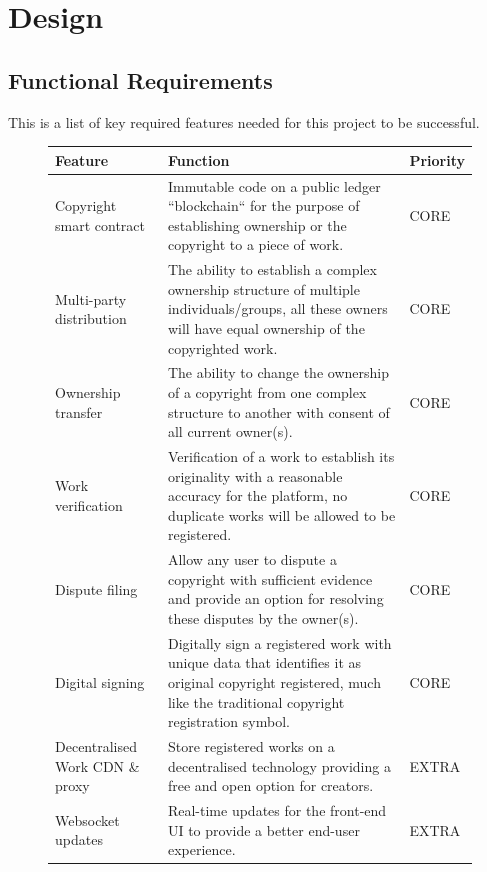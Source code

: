 \section{Design}

\subsection{Functional Requirements}
This is a list of key required features needed for this project to be successful.

\begin{figure}[H]
\caption{Functional requirements}
\begin{table}[H]
\begin{tabular}{|p{}|p{}|p{}|}
\hline
Feature                         & Function                                                                                                                                                        & Priority \\ \hline
Copyright smart contract        & Immutable code on a public ledger “blockchain“ for the purpose of establishing ownership or the copyright to a piece of work.                                   & CORE     \\ \hline
Multi-party distribution        & The ability to establish a complex ownership structure of multiple individuals/groups, all these owners will have equal ownership of the copyrighted work.      & CORE     \\ \hline
Ownership transfer              & The ability to change the ownership of a copyright from one complex structure to another with consent of all current owner(s).                                  & CORE     \\ \hline
Work verification               & Verification of a work to establish its originality with a reasonable accuracy for the platform, no duplicate works will be allowed to be registered.           & CORE     \\ \hline
Dispute filing                  & Allow any user to dispute a copyright with sufficient evidence and provide an option for resolving these disputes by the owner(s).                              & CORE     \\ \hline
Digital signing                 & Digitally sign a registered work with unique data that identifies it as original copyright registered, much like the traditional copyright registration symbol. & CORE     \\ \hline
Decentralised Work CDN \& proxy & Store registered works on a decentralised technology providing a free and open option for creators.                                                             & EXTRA    \\ \hline
Websocket updates               & Real-time updates for the front-end UI to provide a better end-user experience.                                                                                 & EXTRA    \\ \hline
\end{tabular}
\end{table}
\end{figure}

